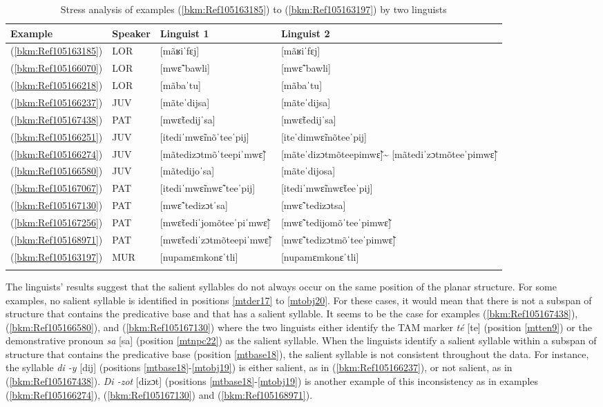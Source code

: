 \documentclass[output=paper]{langscibook}
\begin{document}
\begin{table}
    \centering
    \caption{Stress analysis of examples (\ref{bkm:Ref105163185}) to (\ref{bkm:Ref105163197}) by two linguists}
    \label{tab:mart:key:6}
    \begin{tabular}{llp{4cm}p{4cm}}
         \lsptoprule
Example & Speaker & Linguist 1 & Linguist 2\\ \midrule
(\ref{bkm:Ref105163185}) & LOR & [mãʁiˈfɛj] & [mãʁiˈfɛj]\\
(\ref{bkm:Ref105166070}) & LOR & [mwɛ̃ˈbawli] & [mwɛ̃ˈbawli]\\
(\ref{bkm:Ref105166218}) & LOR & [mãbaˈtu] & [mãbaˈtu]\\
(\ref{bkm:Ref105166237}) & JUV & [mãteˈdijsa] & [mãteˈdijsa]\\
(\ref{bkm:Ref105167438}) & PAT & [mwɛ̃tedijˈsa] & [mwɛ̃tedijˈsa]\\
(\ref{bkm:Ref105166251}) & JUV & [itediˈmwɛ̃mõˈteeˈpij] & [iteˈdimwɛ̃mõteeˈpij]\\
(\ref{bkm:Ref105166274}) & JUV & [mãtedizɔtmõˈteepiˈmwɛ̃] & [mãteˈdizɔtmõteepimwɛ̃]\textasciitilde{} [mãtediˈzɔtmõteeˈpimwɛ̃]\\
(\ref{bkm:Ref105166580}) & JUV & [mãtedijoˈsa] & [mãteˈdijosa]\\
(\ref{bkm:Ref105167067}) & PAT & [itediˈmwɛ̃mwɛ̃ˈteeˈpij] & [itediˈmwɛ̃mwɛ̃teeˈpij]\\
(\ref{bkm:Ref105167130}) & PAT & [mwɛ̃ˈtedizɔtˈsa] & [mwɛ̃ˈtedizɔtsa]\\
(\ref{bkm:Ref105167256}) & PAT & [mwɛ̃tediˈjomõteeˈpiˈmwɛ̃] & [mwɛ̃ˈtedijomõˈteeˈpimwɛ̃]\\
(\ref{bkm:Ref105168971}) & PAT & [mwɛ̃tediˈzɔtmõteepiˈmwɛ̃] & [mwɛ̃ˈtedizɔtmõˈteeˈpimwɛ̃]\\
(\ref{bkm:Ref105163197}) & MUR & [nupamɛmkonɛˈtli] & [nupamɛmkonɛˈtli]\\
\lspbottomrule
    \end{tabular}
\end{table}


The linguists’ results suggest that the salient syllables do not always occur on the same position of the planar structure. For some examples, no salient syllable is identified in positions \ref{mtder17} to \ref{mtobj20}. For these cases, it would mean that there is not a subspan of structure that contains the predicative base and that has a salient syllable. It seems to be the case for examples (\ref{bkm:Ref105167438}), (\ref{bkm:Ref105166580}), and (\ref{bkm:Ref105167130}) where the two linguists either identify the TAM marker \textit{té} [te] (position \ref{mtten9}) or the demonstrative pronoun \textit{sa} [sa] (position \ref{mtnpc22}) as the salient syllable. When the linguists identify a salient syllable within a subspan of structure that contains the predicative base (position \ref{mtbase18}), the salient syllable is not consistent throughout the data. For instance, the syllable \textit{di -y} [dij] (positions \ref{mtbase18}-\ref{mtobj19}) is either salient, as in (\ref{bkm:Ref105166237}), or not salient, as in (\ref{bkm:Ref105167438}). \textit{Di -zot} [dizɔt] (positions \ref{mtbase18}-\ref{mtobj19}) is another example of this inconsistency as in examples (\ref{bkm:Ref105166274}), (\ref{bkm:Ref105167130}) and (\ref{bkm:Ref105168971}).
\end{document}
